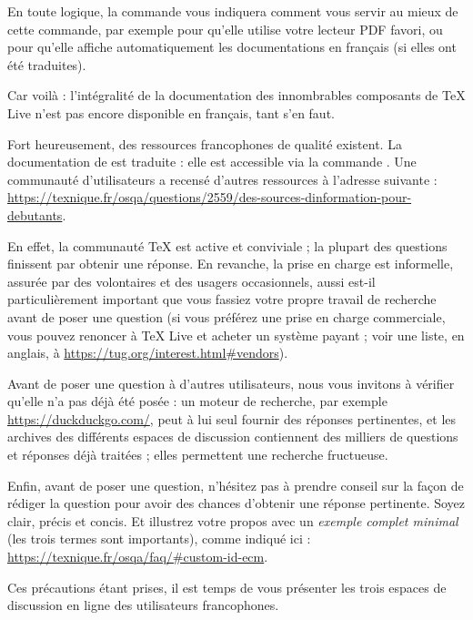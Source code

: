 \documentclass[german, english, french, 12pt]{article}
\renewcommand{\TL}{\TeX{} Live\xspace}%
\begin{document}
En toute logique, la commande  vous indiquera comment vous
servir au mieux de cette commande, par exemple pour qu'elle utilise votre
lecteur PDF favori, ou pour qu'elle affiche automatiquement les documentations
en français (si elles ont été traduites).

Car voilà : l'intégralité de la documentation des innombrables composants de
\TL{} n'est pas encore disponible en français, tant s'en faut.

Fort heureusement, des ressources francophones de qualité existent.  La
documentation de \LaTeXe{} est traduite : elle est accessible via la commande
. Une communauté d'utilisateurs a recensé d'autres
ressources à l'adresse suivante :
\url{https://texnique.fr/osqa/questions/2559/des-sources-dinformation-pour-debutants}.

En effet, la communauté \TeX{} est active et conviviale ; la plupart des
questions finissent par obtenir une réponse. En revanche, la prise en charge est
informelle, assurée par des volontaires et des usagers occasionnels, aussi
est-il particulièrement important que vous fassiez votre propre travail de
recherche avant de poser une question (si vous préférez une prise en charge
commerciale, vous pouvez renoncer à \TL{} et acheter un système payant ; voir
une liste, en anglais, à \url{https://tug.org/interest.html#vendors}).

Avant de poser une question à d'autres utilisateurs, nous vous invitons
à vérifier qu'elle n'a pas déjà été posée : un moteur de recherche, par exemple
\url{https://duckduckgo.com/}, peut à lui seul fournir des réponses pertinentes,
et les archives des différents espaces de discussion contiennent des milliers de
questions et réponses déjà traitées ; elles permettent une recherche fructueuse.

Enfin, avant de poser une question, n'hésitez pas à prendre conseil sur la façon
de rédiger la question pour avoir des chances d'obtenir une réponse pertinente.
Soyez clair, précis et concis. Et illustrez votre propos avec un \emph{exemple
  complet minimal} (les trois termes sont importants), comme indiqué ici :
\url{https://texnique.fr/osqa/faq/#custom-id-ecm}.

Ces précautions étant prises, il est temps de vous présenter les trois espaces
de discussion en ligne des utilisateurs francophones.
\end{document}
